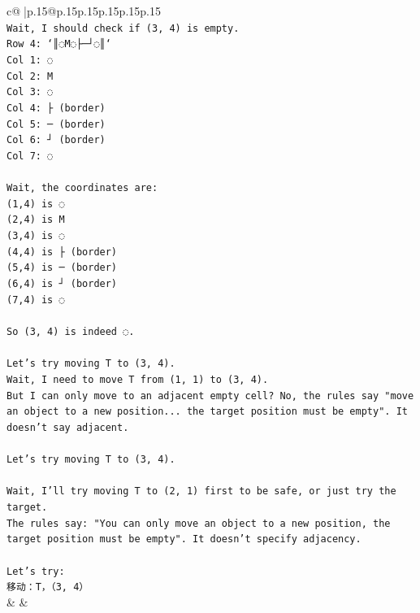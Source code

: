 \documentclass{article}
\begin{document}
{\begin{supertabular}{c@{$\;$}|p{.15\linewidth}@{}p{.15\linewidth}p{.15\linewidth}p{.15\linewidth}p{.15\linewidth}p{.15\linewidth}}
{{{\\ 
\texttt{Wait, I should check if (3, 4) is empty.} \\
\texttt{Row 4: `║◌M◌├─┘◌║`} \\
\texttt{Col 1: ◌} \\
\texttt{Col 2: M} \\
\texttt{Col 3: ◌} \\
\texttt{Col 4: ├ (border)} \\
\texttt{Col 5: ─ (border)} \\
\texttt{Col 6: ┘ (border)} \\
\texttt{Col 7: ◌} \\
\\ 
\texttt{Wait, the coordinates are:} \\
\texttt{(1,4) is ◌} \\
\texttt{(2,4) is M} \\
\texttt{(3,4) is ◌} \\
\texttt{(4,4) is ├ (border)} \\
\texttt{(5,4) is ─ (border)} \\
\texttt{(6,4) is ┘ (border)} \\
\texttt{(7,4) is ◌} \\
\\ 
\texttt{So (3, 4) is indeed ◌.} \\
\\ 
\texttt{Let's try moving T to (3, 4).} \\
\texttt{Wait, I need to move T from (1, 1) to (3, 4).} \\
\texttt{But I can only move to an adjacent empty cell? No, the rules say "move an object to a new position... the target position must be empty". It doesn't say adjacent.} \\
\\ 
\texttt{Let's try moving T to (3, 4).} \\
\\ 
\texttt{Wait, I'll try moving T to (2, 1) first to be safe, or just try the target.} \\
\texttt{The rules say: "You can only move an object to a new position, the target position must be empty". It doesn't specify adjacency.} \\
\\ 
\texttt{Let's try:} \\
\texttt{移动：T，（3, 4）} \\
            }
        }
    }
    & & \\ \\


\end{supertabular}}
\end{document}
